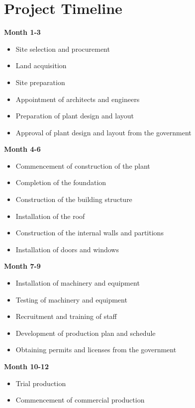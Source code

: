 \section{Project Timeline}

\textbf{Month 1-3}

\begin{itemize}
    \item Site selection and procurement
    \item Land acquisition
    \item Site preparation
    \item Appointment of architects and engineers
    \item Preparation of plant design and layout
    \item Approval of plant design and layout from the government
\end{itemize}

\textbf{Month 4-6}

\begin{itemize}
    \item Commencement of construction of the plant
    \item Completion of the foundation
    \item Construction of the building structure
    \item Installation of the roof
    \item Construction of the internal walls and partitions
    \item Installation of doors and windows
\end{itemize}

\textbf{Month 7-9}

\begin{itemize}
    \item Installation of machinery and equipment
    \item Testing of machinery and equipment
    \item Recruitment and training of staff
    \item Development of production plan and schedule
    \item Obtaining permits and licenses from the government
\end{itemize}

\textbf{Month 10-12}

\begin{itemize}
    \item Trial production
    \item Commencement of commercial production
\end{itemize}

